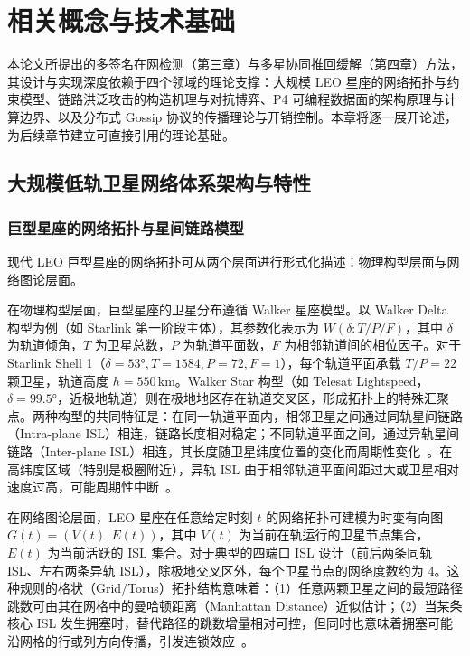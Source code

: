 \chapter{相关概念与技术基础}

本论文所提出的多签名在网检测（第三章）与多星协同推回缓解（第四章）方法，其设计与实现深度依赖于四个领域的理论支撑：大规模 LEO 星座的网络拓扑与约束模型、链路洪泛攻击的构造机理与对抗博弈、P4 可编程数据面的架构原理与计算边界、以及分布式 Gossip 协议的传播理论与开销控制。本章将逐一展开论述，为后续章节建立可直接引用的理论基础。

\section{大规模低轨卫星网络体系架构与特性}

\subsection{巨型星座的网络拓扑与星间链路模型}

现代 LEO 巨型星座的网络拓扑可从两个层面进行形式化描述：物理构型层面与网络图论层面。

在物理构型层面，巨型星座的卫星分布遵循 Walker 星座模型。以 Walker Delta 构型为例（如 Starlink 第一阶段主体），其参数化表示为 $W(\delta: T/P/F)$，其中 $\delta$ 为轨道倾角，$T$ 为卫星总数，$P$ 为轨道平面数，$F$ 为相邻轨道间的相位因子。对于 Starlink Shell 1（$\delta=53°, T=1584, P=72, F=1$），每个轨道平面承载 $T/P = 22$ 颗卫星，轨道高度 $h = 550$\,km。Walker Star 构型（如 Telesat Lightspeed，$\delta=99.5°$，近极地轨道）则在极地地区存在轨道交叉区，形成拓扑上的特殊汇聚点。两种构型的共同特征是：在同一轨道平面内，相邻卫星之间通过同轨星间链路（Intra-plane ISL）相连，链路长度相对稳定；不同轨道平面之间，通过异轨星间链路（Inter-plane ISL）相连，其长度随卫星纬度位置的变化而周期性变化~\cite{laser_isl}。在高纬度区域（特别是极圈附近），异轨 ISL 由于相邻轨道平面间距过大或卫星相对速度过高，可能周期性中断~\cite{walker1984satellite, kodheli2021satellite}。

在网络图论层面，LEO 星座在任意给定时刻 $t$ 的网络拓扑可建模为时变有向图 $G(t) = (V(t), E(t))$，其中 $V(t)$ 为当前在轨运行的卫星节点集合，$E(t)$ 为当前活跃的 ISL 集合。对于典型的四端口 ISL 设计（前后两条同轨 ISL、左右两条异轨 ISL），除极地交叉区外，每个卫星节点的网络度数约为 4。这种规则的格状（Grid/Torus）拓扑结构意味着：（1）任意两颗卫星之间的最短路径跳数可由其在网格中的曼哈顿距离（Manhattan Distance）近似估计；（2）当某条核心 ISL 发生拥塞时，替代路径的跳数增量相对可控，但同时也意味着拥塞可能沿网格的行或列方向传播，引发连锁效应~\cite{handley2019delay, icarus}。

